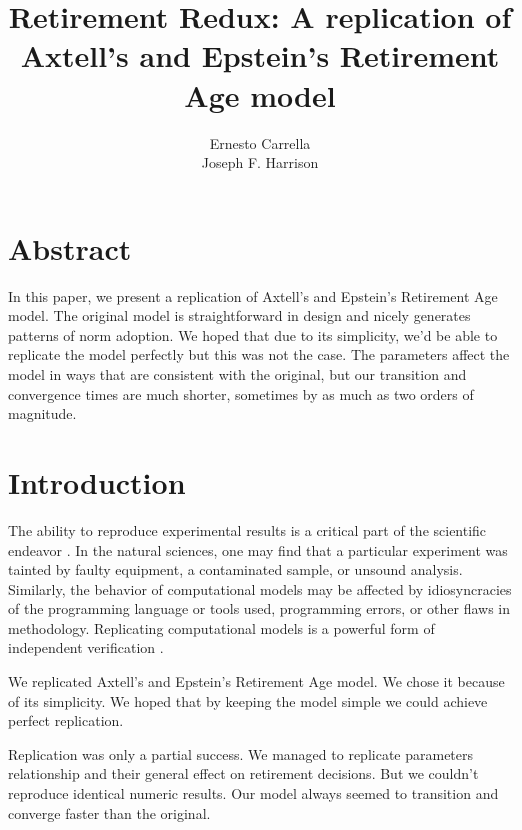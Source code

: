 \documentclass[runningheads,a4paper]{article}
\newcommand{\doctitle}[0]{Retirement Redux: A replication of Axtell's and Epstein's Retirement Age model}
\begin{document}
\title{\doctitle}
\author{Ernesto Carrella \\ Joseph F. Harrison}

\maketitle

\section*{Abstract}
In this paper, we present a replication of Axtell's and Epstein's Retirement Age model\cite{axtell_coordination_2006}. 
The original model is straightforward in design and nicely generates patterns of norm adoption. 
We hoped that due to its simplicity, we'd be able to replicate the model perfectly but this was not the case.
The parameters affect the model in ways that are consistent with the original, but our transition and convergence times
are much shorter, sometimes by as much as two orders of magnitude.

\section{Introduction}
\label{sec:intro}

The ability to reproduce experimental results is a critical part of the scientific endeavor \cite{popper1959logic}. 
In the natural sciences, one may find that a particular experiment was tainted by faulty equipment, a contaminated sample, or unsound analysis. 
Similarly, the behavior of computational models may be affected by idiosyncracies of the programming language or tools used, programming errors, or other flaws in methodology. Replicating computational models is a powerful form of independent verification \cite{wilensky2007making,rand2006verification}.

We replicated Axtell's and Epstein's Retirement Age model\cite{axtell_coordination_2006}. 
We chose it because of its simplicity.
We hoped that by keeping the model simple we could achieve perfect replication.

Replication was only a partial success.
We managed to replicate parameters relationship and their general effect on retirement decisions.
But we couldn't reproduce identical numeric results.
Our model always seemed to transition and converge faster than the original.
\end{document}
